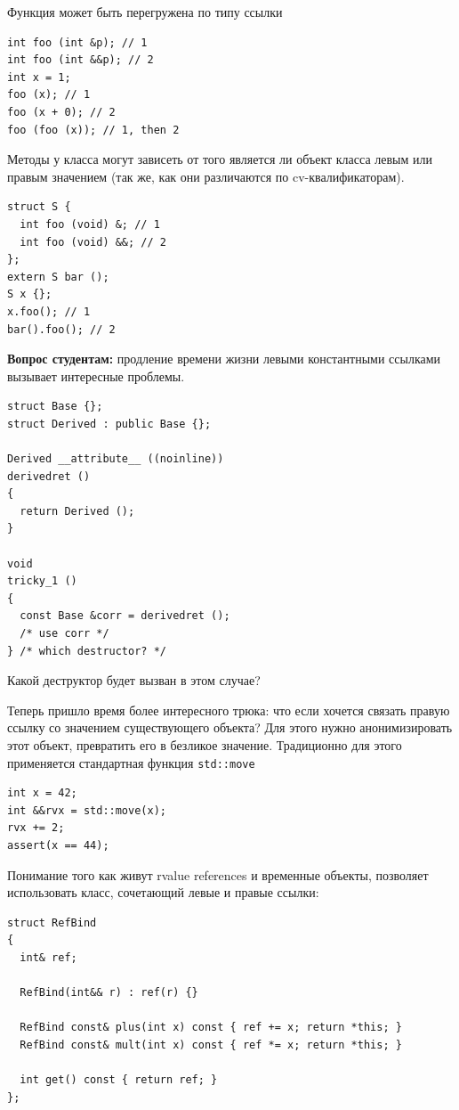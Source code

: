 \documentclass[a4paper,12pt,oneside]{article}
\newif\ifanswers
\begin{document}
Функция может быть перегружена по типу ссылки

\begin{lstlisting}
int foo (int &p); // 1
int foo (int &&p); // 2
int x = 1;
foo (x); // 1
foo (x + 0); // 2
foo (foo (x)); // 1, then 2
\end{lstlisting}

Методы у класса могут зависеть от того является ли объект класса левым или правым значением (так же, как они различаются по cv-квалификаторам).

\begin{lstlisting}
struct S {
  int foo (void) &; // 1
  int foo (void) &&; // 2
};
extern S bar ();
S x {};
x.foo(); // 1
bar().foo(); // 2
\end{lstlisting}

\textbf{Вопрос студентам:} продление времени жизни левыми константными ссылками вызывает интересные проблемы.

\begin{lstlisting}
struct Base {};
struct Derived : public Base {};

Derived __attribute__ ((noinline))
derivedret ()
{
  return Derived ();
}

void
tricky_1 ()
{
  const Base &corr = derivedret ();
  /* use corr */
} /* which destructor? */
\end{lstlisting}

Какой деструктор будет вызван в этом случае? 

\ifanswers
Правильный ответ: Оказывается статический тип временного объекта известен компилятору и будет вызван деструктор класса \lstinline!Derived!. То есть ссылки не требуют виртуальных деструкторов для своей диспетчеризации -- компилятор сам может построить верный код удаления.
\fi

Теперь пришло время более интересного трюка: что если хочется связать правую ссылку со значением существующего объекта? Для этого нужно анонимизировать этот объект, превратить его в безликое значение. Традиционно для этого применяется стандартная функция \lstinline!std::move!

\begin{lstlisting}
int x = 42;
int &&rvx = std::move(x);
rvx += 2; 
assert(x == 44);
\end{lstlisting}

Понимание того как живут rvalue references и временные объекты, позволяет использовать класс, сочетающий левые и правые ссылки:

\begin{lstlisting}
struct RefBind
{
  int& ref;

  RefBind(int&& r) : ref(r) {}

  RefBind const& plus(int x) const { ref += x; return *this; }
  RefBind const& mult(int x) const { ref *= x; return *this; }

  int get() const { return ref; }
};
\end{lstlisting}
\end{document}
